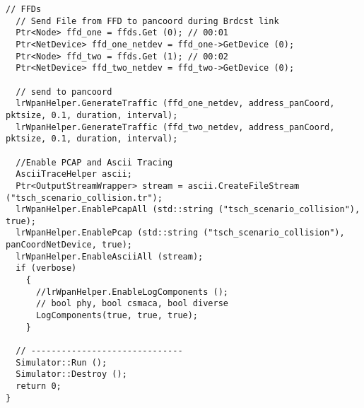 \begin{lstlisting}[frame=single]
  // FFDs
  // Send File from FFD to pancoord during Brdcst link
  Ptr<Node> ffd_one = ffds.Get (0); // 00:01
  Ptr<NetDevice> ffd_one_netdev = ffd_one->GetDevice (0);
  Ptr<Node> ffd_two = ffds.Get (1); // 00:02
  Ptr<NetDevice> ffd_two_netdev = ffd_two->GetDevice (0);

  // send to pancoord
  lrWpanHelper.GenerateTraffic (ffd_one_netdev, address_panCoord, pktsize, 0.1, duration, interval);
  lrWpanHelper.GenerateTraffic (ffd_two_netdev, address_panCoord, pktsize, 0.1, duration, interval);

  //Enable PCAP and Ascii Tracing
  AsciiTraceHelper ascii;
  Ptr<OutputStreamWrapper> stream = ascii.CreateFileStream ("tsch_scenario_collision.tr");
  lrWpanHelper.EnablePcapAll (std::string ("tsch_scenario_collision"), true);
  lrWpanHelper.EnablePcap (std::string ("tsch_scenario_collision"), panCoordNetDevice, true);
  lrWpanHelper.EnableAsciiAll (stream);
  if (verbose)
    {
      //lrWpanHelper.EnableLogComponents ();
      // bool phy, bool csmaca, bool diverse
      LogComponents(true, true, true);
    }

  // ------------------------------
  Simulator::Run ();
  Simulator::Destroy ();
  return 0;
}
\end{lstlisting}
